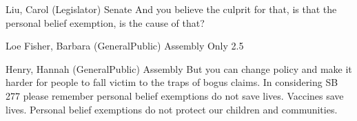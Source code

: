 \begin{result}{11.827085347973137}{Liu, Carol (Legislator) Senate}
And you believe the culprit for that, is that the personal belief exemption, is the cause of that?
\end{result}

\begin{result}{11.561759446383135}{Loe Fisher, Barbara (GeneralPublic) Assembly}
Only 2.5%
\end{result}

\begin{result}{11.54110079431982}{Henry, Hannah (GeneralPublic) Assembly}
But you can change policy and make it harder for people to fall victim to the traps of bogus claims. In considering SB 277 please remember personal belief exemptions do not save lives. Vaccines save lives. Personal belief exemptions do not protect our children and communities.
\end{result}

